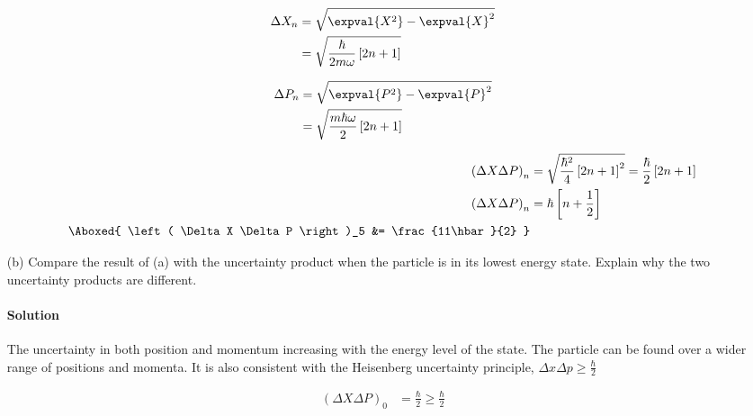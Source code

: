 \documentclass{article}
\begin{document}
\begin{enumerate}
		\begin{minipage}{0.45\textwidth}
			\begin{equation}
				\begin{split}
					\Delta X_n &= \sqrt{\expval{X^2} - \expval{X}^2} \\
					&= \sqrt{ \frac{\hbar}{2m\omega} \left[ 2n + 1 \right] }
				\end{split}
			\end{equation}
		\end{minipage}
		\begin{minipage}{0.45\textwidth}
			\begin{equation}
				\begin{split}
					\Delta P_n &= \sqrt{\expval{P^2} - \expval{P}^2} \\
					&= \sqrt{ \frac{m\hbar\omega}{2} \left[ 2n + 1 \right] }
				\end{split}
			\end{equation}
		\end{minipage}
		
		\begin{equation}
			\begin{split}
				\left( \Delta X \Delta P \right)_n &= \sqrt{ \frac{\hbar^2}{4} \left[ 2n + 1 \right]^2 } = \frac{\hbar}{2} \left[ 2n + 1 \right] \\
				\left( \Delta X \Delta P \right)_n &= \hbar \left[ n + \frac{1}{2} \right] \\
				\Aboxed{ \left( \Delta X \Delta P \right)_5 &= \frac{11\hbar}{2} }
			\end{split}
		\end{equation}
		
		
		
		\item[(b)]  Compare the result of (a) with the uncertainty product when the particle is in its lowest energy state. Explain why the two uncertainty products are different.
		\paragraph{Solution} The uncertainty in both position and momentum increasing with the energy level of the state. The particle can be found over a wider range of positions and momenta. It is also consistent with the Heisenberg uncertainty principle, $\Delta x \Delta p \geq \frac{\hbar}{2}$
		
		\begin{equation}
			\begin{split}
				\left( \Delta X \Delta P \right)_0 &= \frac{\hbar}{2} \geq \frac{\hbar}{2}
			\end{split}
		\end{equation}
		
		
		
	\end{enumerate}
\end{document}
